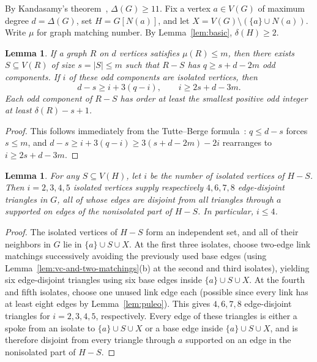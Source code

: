 \documentclass[11pt]{article}
\newtheorem{lemma}[theorem]{Lemma}
\begin{document}
By Kandasamy's theorem~\cite{Kandasamy}, $\Delta(G)\geq 11$. Fix a vertex $a\in V(G)$ of maximum degree $d=\Delta(G)$, set $H=G[N(a)]$, and let $X=V(G)\setminus(\{a\}\cup N(a))$. Write $\mu$ for graph matching number. By Lemma~\ref{lem:basic}, $\delta(H)\geq 2$.

\begin{lemma}\label{lem:tb}
If a graph $R$ on $d$ vertices satisfies $\mu(R)\leq m$, then there exists $S\subseteq V(R)$ of size $s=|S|\leq m$ such that $R-S$ has $q\geq s+d-2m$ odd components. If $i$ of these odd components are isolated vertices, then
\[
d-s\geq i+3(q-i), \qquad i\geq 2s+d-3m.
\]
Each odd component of $R-S$ has order at least the smallest positive odd integer at least $\delta(R)-s+1$.
\end{lemma}

\begin{proof}
This follows immediately from the Tutte--Berge formula~\cite{Schrijver}: $q\leq d-s$ forces $s\leq m$, and $d-s\geq i+3(q-i)\geq 3(s+d-2m)-2i$ rearranges to $i\geq 2s+d-3m$.
\end{proof}

\begin{lemma}\label{lem:isolates}
For any $S\subseteq V(H)$, let $i$ be the number of isolated vertices of $H-S$. Then $i=2,3,4,5$ isolated vertices supply respectively $4,6,7,8$ edge-disjoint triangles in $G$, all of whose edges are disjoint from all triangles through $a$ supported on edges of the nonisolated part of $H-S$. In particular, $i\leq 4$.
\end{lemma}

\begin{proof}
The isolated vertices of $H-S$ form an independent set, and all of their neighbors in $G$ lie in $\{a\}\cup S\cup X$. At the first three isolates, choose two-edge link matchings successively avoiding the previously used base edges (using Lemma~\ref{lem:vc-and-two-matchings}(b) at the second and third isolates), yielding six edge-disjoint triangles using six base edges inside $\{a\}\cup S\cup X$. At the fourth and fifth isolates, choose one unused link edge each (possible since every link has at least eight edges by Lemma~\ref{lem:puleo}). This gives $4,6,7,8$ edge-disjoint triangles for $i=2,3,4,5$, respectively. Every edge of these triangles is either a spoke from an isolate to $\{a\}\cup S\cup X$ or a base edge inside $\{a\}\cup S\cup X$, and is therefore disjoint from every triangle through $a$ supported on an edge in the nonisolated part of $H-S$.
\end{proof}
\end{document}
